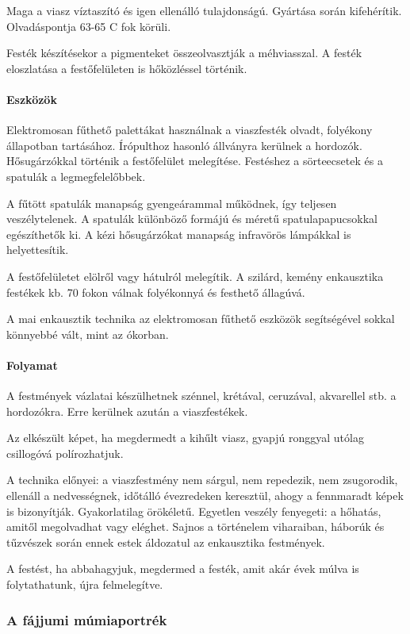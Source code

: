 Maga a viasz víztaszító és igen ellenálló tulajdonságú. Gyártása során kifehérítik. Olvadáspontja 63-65 C fok körüli.

Festék készítésekor a pigmenteket összeolvasztják a méhviasszal. A festék eloszlatása a festőfelületen is hőközléssel történik.

\paragraph{Eszközök}
Elektromosan fűthető palettákat használnak a viaszfesték olvadt, folyékony állapotban tartásához. Írópulthoz hasonló állványra kerülnek a hordozók. Hősugárzókkal történik a festőfelület melegítése. Festéshez a sörteecsetek és a spatulák a legmegfelelőbbek.

A fűtött spatulák manapság gyengeárammal működnek, így teljesen veszélytelenek. A spatulák különböző formájú és méretű spatulapapucsokkal egészíthetők ki. A kézi hősugárzókat manapság infravörös lámpákkal is helyettesítik.

A festőfelületet elölről vagy hátulról melegítik. A szilárd, kemény enkausztika festékek kb. 70 fokon válnak folyékonnyá és festhető állagúvá.

A mai enkausztik technika az elektromosan fűthető eszközök segítségével sokkal könnyebbé vált, mint az ókorban.

\paragraph{Folyamat}
A festmények vázlatai készülhetnek szénnel, krétával, ceruzával, akvarellel stb. a hordozókra. Erre kerülnek azután a viaszfestékek.

Az elkészült képet, ha megdermedt a kihűlt viasz, gyapjú ronggyal utólag csillogóvá polírozhatjuk.

A technika előnyei: a viaszfestmény nem sárgul, nem repedezik, nem zsugorodik, ellenáll a nedvességnek, időtálló évezredeken keresztül, ahogy a fennmaradt képek is bizonyítják. Gyakorlatilag örökéletű. Egyetlen veszély fenyegeti: a hőhatás, amitől megolvadhat vagy eléghet. Sajnos a történelem viharaiban, háborúk és tűzvészek során ennek estek áldozatul az enkausztika festmények.

A festést, ha abbahagyjuk, megdermed a festék, amit akár évek múlva is folytathatunk, újra felmelegítve.

\subsubsection{A fájjumi múmiaportrék}

